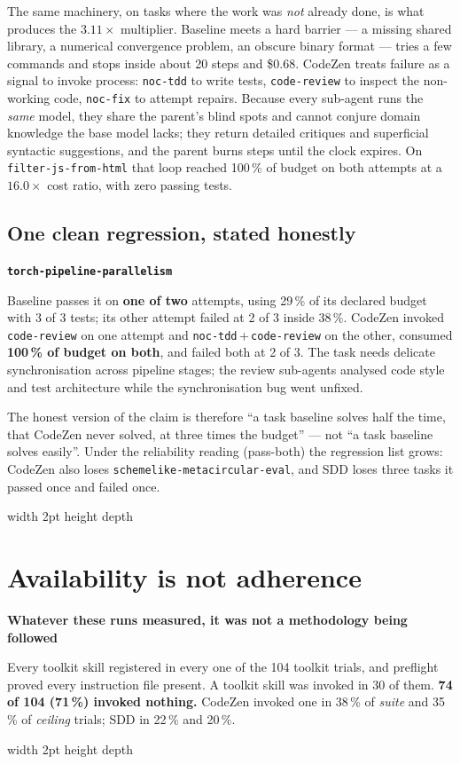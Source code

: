 \documentclass[11pt,a4paper]{article}
\newenvironment{finding}[1]
  {\par\medskip\noindent\begin{lrbox}{\findingbox}%
   \begin{minipage}{\dimexpr\linewidth-2\fboxsep-4pt}%
   \vspace{3pt}\textbf{\color{accent}#1}\par\smallskip\small}
  {\vspace{4pt}\end{minipage}\end{lrbox}%
   \noindent\textcolor{accent}{\vrule width 2pt height \dimexpr\ht\findingbox\relax depth \dimexpr\dp\findingbox\relax}%
   \colorbox{shade}{\usebox{\findingbox}}\par\medskip}
\newcommand{\code}[1]{\texttt{\small #1}}
\newcommand{\task}[1]{\texttt{\footnotesize #1}}
\begin{document}
\noindent The same machinery, on tasks where the work was \emph{not} already done, is what
produces the $3.11\times$ multiplier. Baseline meets a hard barrier --- a missing shared
library, a numerical convergence problem, an obscure binary format --- tries a few commands
and stops inside about 20 steps and \$0.68. CodeZen treats failure as a signal to invoke
process: \code{noc-tdd} to write tests, \code{code-review} to inspect the non-working code,
\code{noc-fix} to attempt repairs. Because every sub-agent runs the \emph{same} model, they
share the parent's blind spots and cannot conjure domain knowledge the base model lacks; they
return detailed critiques and superficial syntactic suggestions, and the parent burns steps
until the clock expires. On \task{filter-js-from-html} that loop reached 100\,\% of budget on
both attempts at a $16.0\times$ cost ratio, with zero passing tests.

\subsection{One clean regression, stated honestly}

\begin{finding}{\task{torch-pipeline-parallelism}}
Baseline passes it on \textbf{one of two} attempts, using 29\,\% of its declared budget with 3
of 3 tests; its other attempt failed at 2 of 3 inside 38\,\%. CodeZen invoked
\code{code-review} on one attempt and \code{noc-tdd}\,+\,\code{code-review} on the other,
consumed \textbf{100\,\% of budget on both}, and failed both at 2 of 3. The task needs delicate
synchronisation across pipeline stages; the review sub-agents analysed code style and test
architecture while the synchronisation bug went unfixed.

The honest version of the claim is therefore ``a task baseline solves half the time, that
CodeZen never solved, at three times the budget'' --- not ``a task baseline solves easily''.
Under the reliability reading (pass-both) the regression list grows: CodeZen also loses
\task{schemelike-metacircular-eval}, and SDD loses three tasks it passed once and failed once.
\end{finding}

\clearpage
\section{Availability is not adherence}
\label{sec:adherence}

\begin{finding}{Whatever these runs measured, it was not a methodology being followed}
Every toolkit skill registered in every one of the 104 toolkit trials, and preflight proved
every instruction file present. A toolkit skill was invoked in 30 of them. \textbf{74 of 104
(71\,\%) invoked nothing.} CodeZen invoked one in 38\,\% of \emph{suite} and 35\,\% of
\emph{ceiling} trials; SDD in 22\,\% and 20\,\%.
\end{finding}
\end{document}
